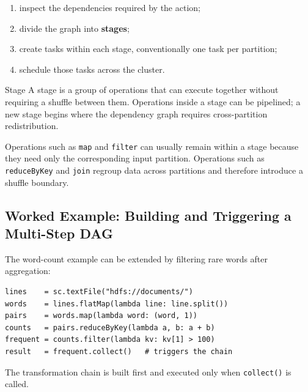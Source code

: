 \documentclass[11pt,a4paper,oneside]{book}
\begin{document}
\begin{enumerate}
    \item inspect the dependencies required by the action;
    \item divide the graph into \textbf{stages};
    \item create tasks within each stage, conventionally one task per partition;
    \item schedule those tasks across the cluster.
\end{enumerate}

\begin{definitionbox}{Stage}
A stage is a group of operations that can execute together without requiring a shuffle between them. Operations inside a stage can be pipelined; a new stage begins where the dependency graph requires cross-partition redistribution.
\end{definitionbox}

Operations such as \texttt{map} and \texttt{filter} can usually remain within a stage because they need only the corresponding input partition. Operations such as \texttt{reduceByKey} and \texttt{join} regroup data across partitions and therefore introduce a shuffle boundary.

\subsection{Worked Example: Building and Triggering a Multi-Step DAG}

The word-count example can be extended by filtering rare words after aggregation:

\begin{lstlisting}[style=sparkcode]
lines    = sc.textFile("hdfs://documents/")
words    = lines.flatMap(lambda line: line.split())
pairs    = words.map(lambda word: (word, 1))
counts   = pairs.reduceByKey(lambda a, b: a + b)
frequent = counts.filter(lambda kv: kv[1] > 100)
result   = frequent.collect()   # triggers the chain
\end{lstlisting}

The transformation chain is built first and executed only when \texttt{collect()} is called.
\end{document}
